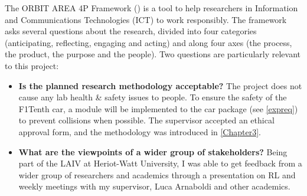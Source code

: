 The ORBIT AREA 4P Framework (\cite{orbit}) is a tool to help researchers in Information and Communications Technologies (ICT) to work responsibly. The framework asks several questions about the research, divided into four categories (anticipating, reflecting, engaging and acting) and along four axes (the process, the product, the purpose and the people). Two questions are particularly relevant to this project:
\begin{itemize}
	\item \textbf{Is the planned research methodology acceptable?} The project does not cause any lab health \& safety issues to people. To ensure the safety of the F1Tenth car, a module will be implemented to the car package (see \ref{expreq}) to prevent collisions when possible. The supervisor accepted an ethical approval form, and the methodology was introduced in \ref{Chapter3}.
	\item \textbf{What are the viewpoints of a wider group of stakeholders?} Being part of the LAIV at Heriot-Watt University, I was able to get feedback from a wider group of researchers and academics through a presentation on RL and weekly meetings with my supervisor, Luca Arnaboldi and other academics.
\end{itemize}
